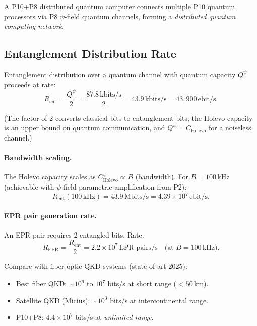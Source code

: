 \documentclass[11pt]{article}
\theoremstyle{definition}
\theoremstyle{remark}
\begin{document}
A P10+P8 distributed quantum computer connects multiple P10 quantum
processors via P8 $\psi$-field quantum channels, forming a \emph{distributed
quantum computing network}.

\subsection{Entanglement Distribution Rate}

Entanglement distribution over a quantum channel with quantum capacity
$Q^\psi$ proceeds at rate:
\begin{equation}
R_{\mathrm{ent}} = \frac{Q^\psi}{2} = \frac{87.8\,\mathrm{kbits/s}}{2}
= 43.9\,\mathrm{kbits/s} = 43{,}900\,\text{ebit/s}.
\label{eq:ent_rate_raw}
\end{equation}

(The factor of 2 converts classical bits to entanglement bits; the
Holevo capacity is an upper bound on quantum communication, and
$Q^\psi = C_{\mathrm{Holevo}}$ for a noiseless channel.)

\paragraph{Bandwidth scaling.}
The Holevo capacity scales as $C_{\mathrm{Holevo}}^\psi \propto B$
(bandwidth). For $B = 100\,\mathrm{kHz}$ (achievable with
$\psi$-field parametric amplification from P2):
\begin{equation}
R_{\mathrm{ent}}(100\,\mathrm{kHz}) = 43.9\,\mathrm{Mbits/s}
= 4.39\times10^7\,\text{ebit/s}.
\label{eq:ent_rate_100k}
\end{equation}

\paragraph{EPR pair generation rate.}
An EPR pair requires 2 entangled bits. Rate:
\begin{equation}
R_{\mathrm{EPR}} = \frac{R_{\mathrm{ent}}}{2}
= 2.2\times10^7\,\text{EPR pairs/s}
\quad\text{(at $B = 100\,\mathrm{kHz}$)}.
\label{eq:epr_rate}
\end{equation}

Compare with fiber-optic QKD systems (state-of-art 2025):
\begin{itemize}[nosep]
\item Best fiber QKD: $\sim10^6$ to $10^7$ bits/s at short range ($<50\,\mathrm{km}$).
\item Satellite QKD (Micius): $\sim10^3$ bits/s at intercontinental range.
\item P10+P8: $4.4\times10^7$ bits/s at \emph{unlimited range}.
\end{itemize}
\end{document}
